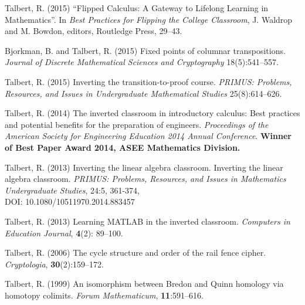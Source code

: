 \documentclass[letterpaper]{article}
\renewenvironment{itemize}{
  \begin{list}{}{
    \setlength{\leftmargin}{1.5em}
	\setlength{\itemsep}{0in}
  }
}{
  \end{list}
}
\begin{document}
\begin{itemize}
\item Talbert, R. (2015) ``Flipped Calculus: A Gateway to Lifelong Learning in Mathematics''.  In \emph{Best Practices for Flipping the College Classroom}, J. Waldrop and M. Bowdon, editors, Routledge Press, 29--43.
\item Bjorkman, B. and Talbert, R. (2015) Fixed points of columnar transpositions. \emph{Journal of Discrete Mathematical Sciences and Cryptography} 18(5):541--557. 
\item Talbert, R. (2015) Inverting the transition-to-proof course. \emph{PRIMUS: Problems, Resources, and Issues in Undergraduate Mathematical Studies} 25(8):614--626. 
\item Talbert, R. (2014) The inverted classroom in introductory calculus: Best practices and potential benefits for the preparation of engineers. \emph{Proceedings of the American Society for Engineering Education 2014 Annual Conference}.  \textbf{Winner of Best Paper Award 2014, ASEE Mathematics Division.}
\item Talbert, R. (2013) Inverting the linear algebra classroom. Inverting the linear algebra classroom. \emph{PRIMUS: Problems, Resources, and Issues in Mathematics Undergraduate Studies}, 24:5, 361-374, \\ DOI: 10.1080/10511970.2014.883457
\item Talbert, R. (2013) Learning MATLAB in the inverted classroom. \emph{Computers in Education Journal}, \textbf{4}(2): 89--100.  
\item Talbert, R. (2006) The cycle structure and order of the rail fence cipher. \emph{Cryptologia}, \textbf{30}(2):159--172. 
\item Talbert, R. (1999) An isomorphism between Bredon and Quinn homology via homotopy colimits. \emph{Forum Mathematicum}, \textbf{11}:591--616. 
\end{itemize}
\end{document}
